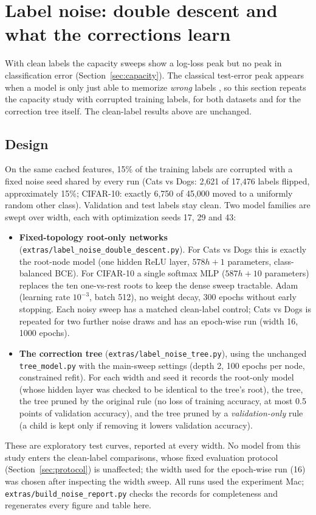 \section{Label noise: double descent and what the corrections learn}\label{sec:noise}
With clean labels the capacity sweeps show a log-loss peak but no peak in classification error (Section~\ref{sec:capacity}). The classical test-error peak appears when a model is only just able to memorize \emph{wrong} labels \cite{dd}, so this section repeats the capacity study with corrupted training labels, for both datasets and for the correction tree itself. The clean-label results above are unchanged.

\subsection{Design}
On the same cached features, 15\% of the training labels are corrupted with a fixed noise seed shared by every run (Cats vs Dogs: 2,621 of 17,476 labels flipped, approximately 15\%; CIFAR-10: exactly 6,750 of 45,000 moved to a uniformly random other class). Validation and test labels stay clean. Two model families are swept over width, each with optimization seeds 17, 29 and 43:
\begin{itemize}
\item \textbf{Fixed-topology root-only networks} (\texttt{extras/label\_noise\_double\_descent.py}). For Cats vs Dogs this is exactly the root-node model (one hidden ReLU layer, $578h+1$ parameters, class-balanced BCE). For CIFAR-10 a single softmax MLP ($587h+10$ parameters) replaces the ten one-vs-rest roots to keep the dense sweep tractable. Adam (learning rate $10^{-3}$, batch 512), no weight decay, 300 epochs without early stopping. Each noisy sweep has a matched clean-label control; Cats vs Dogs is repeated for two further noise draws and has an epoch-wise run (width 16, 1000 epochs).
\item \textbf{The correction tree} (\texttt{extras/label\_noise\_tree.py}), using the unchanged \texttt{tree\_model.py} with the main-sweep settings (depth 2, 100 epochs per node, constrained refit). For each width and seed it records the root-only model (whose hidden layer was checked to be identical to the tree's root), the tree, the tree pruned by the original rule (no loss of training accuracy, at most 0.5 points of validation accuracy), and the tree pruned by a \emph{validation-only} rule (a child is kept only if removing it lowers validation accuracy).
\end{itemize}
These are exploratory test curves, reported at every width. No model from this study enters the clean-label comparisons, whose fixed evaluation protocol (Section~\ref{sec:protocol}) is unaffected; the width used for the epoch-wise run (16) was chosen after inspecting the width sweep. All runs used the experiment Mac; \texttt{extras/build\_noise\_report.py} checks the records for completeness and regenerates every figure and table here.

